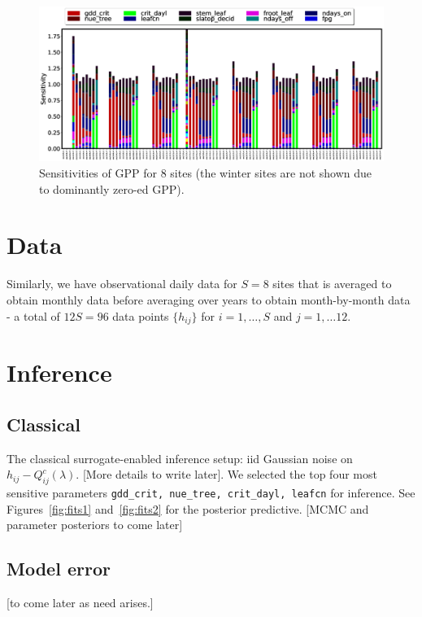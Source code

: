 \documentclass[12pt]{article}
\begin{document}
\begin{figure}[!hb]
\includegraphics[width=\textwidth]{figs/sens.eps}
\caption{\label{fig:sens} Sensitivities of GPP for 8 sites (the winter sites are not shown due to dominantly zero-ed GPP). }
\end{figure}

\section{Data}

Similarly, we have observational daily data for $S=8$ sites that is averaged to obtain monthly data before averaging over years to obtain month-by-month data - a total of $12S=96$ data points $\{h_{ij}\}$ for $i=1,\dots,S$ and $j=1,\dots 12$.

\section{Inference}

\subsection{Classical}
The classical surrogate-enabled inference setup: iid Gaussian noise on $h_{ij}-Q^c_{ij}(\lambda)$. [More details to write later]. We selected the top four most sensitive parameters
\verb#gdd_crit, nue_tree, crit_dayl, leafcn# for inference. See Figures~\ref{fig:fits1} and~\ref{fig:fits2} for the posterior predictive. [MCMC and parameter posteriors to come later]

\subsection{Model error}
[to come later as need arises.]
\end{document}
